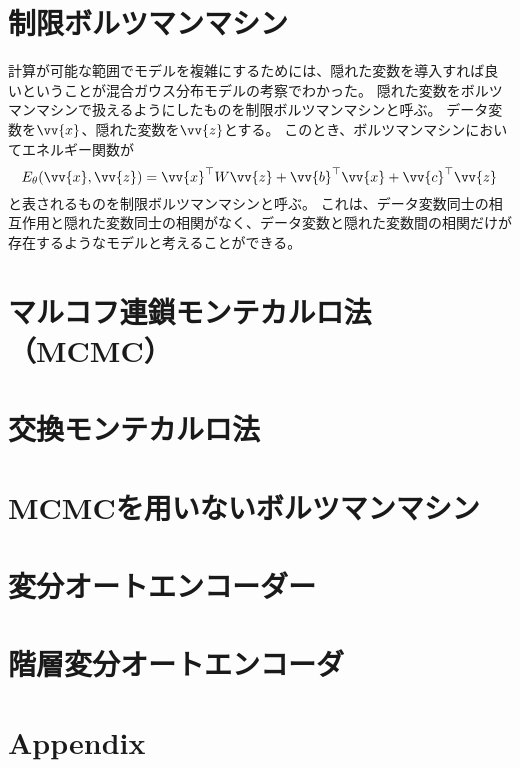 \documentclass[a4paper,11pt,uplatex]{jsarticle}%
\begin{document}
\section{制限ボルツマンマシン}
計算が可能な範囲でモデルを複雑にするためには、隠れた変数を導入すれば良いということが混合ガウス分布モデルの考察でわかった。
隠れた変数をボルツマンマシンで扱えるようにしたものを制限ボルツマンマシンと呼ぶ。
データ変数を$\vv{x}$、隠れた変数を$\vv{z}$とする。
このとき、ボルツマンマシンにおいてエネルギー関数が
\begin{equation}
  E_{\theta}(\vv{x},\vv{z})=\vv{x}^{\top}W\vv{z} + \vv{b}^{\top}\vv{x}+\vv{c}^{\top}\vv{z}
\end{equation}
と表されるものを制限ボルツマンマシンと呼ぶ。
これは、データ変数同士の相互作用と隠れた変数同士の相関がなく、データ変数と隠れた変数間の相関だけが存在するようなモデルと考えることができる。

\section{マルコフ連鎖モンテカルロ法（MCMC）}

\section{交換モンテカルロ法}

\section{MCMCを用いないボルツマンマシン}

\section{変分オートエンコーダー}

\section{階層変分オートエンコーダ}

\section{Appendix}
\end{document}
